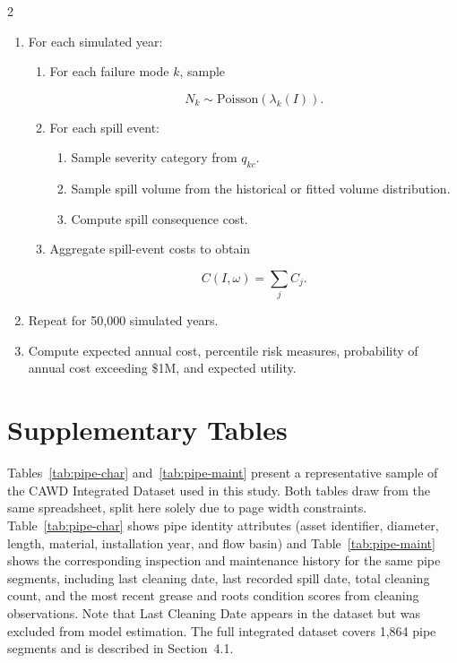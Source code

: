 \documentclass[10pt]{article}
\begin{document}
\begin{multicols}{2}
\begin{enumerate}[leftmargin=*]
\[
\lambda_k(I)
=
\lambda_k^0
\exp
\left(
-\sum_i \alpha_{ki} I_i
\right).
\]

\item For each simulated year:

\begin{enumerate}

\item For each failure mode $k$, sample

\[
N_k \sim \text{Poisson}(\lambda_k(I)).
\]

\item For each spill event:

\begin{enumerate}

\item Sample severity category from $q_{kc}$.

\item Sample spill volume from the historical or fitted volume distribution.

\item Compute spill consequence cost.

\end{enumerate}

\item Aggregate spill-event costs to obtain

\[
C(I,\omega)
=
\sum_j C_j.
\]

\end{enumerate}

\item Repeat for 50{,}000 simulated years.

\item Compute expected annual cost, percentile risk measures,
probability of annual cost exceeding \$1M, and expected utility.

\end{enumerate}

\end{multicols}

\section{Supplementary Tables}

Tables~\ref{tab:pipe-char} and~\ref{tab:pipe-maint} present a representative
sample of the CAWD Integrated Dataset used in this study. Both tables draw
from the same spreadsheet, split here solely due to page width constraints.
Table~\ref{tab:pipe-char} shows pipe identity attributes (asset identifier,
diameter, length, material, installation year, and flow basin) and
Table~\ref{tab:pipe-maint} shows the corresponding inspection and maintenance
history for the same pipe segments, including last cleaning date, last recorded
spill date, total cleaning count, and the most recent grease and roots condition
scores from cleaning observations. Note that Last Cleaning Date appears in the
dataset but was excluded from model estimation. The full integrated dataset
covers 1,864 pipe segments and is described in Section~4.1.
\end{document}
